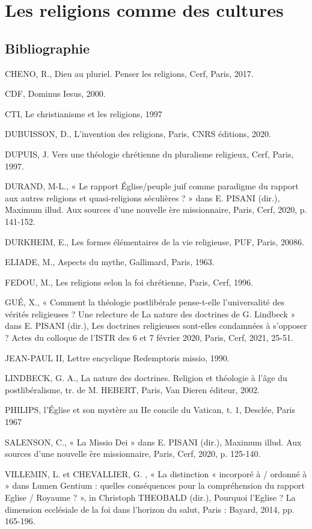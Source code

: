 \chapter{Les religions comme des cultures }


\section{Bibliographie}
CHENO, R., Dieu au pluriel. Penser les religions, Cerf, Paris, 2017. 

CDF, Dominus Iesus, 2000. 

CTI, Le christianisme et les religions, 1997 

DUBUISSON, D., L’invention des religions, Paris, CNRS éditions, 2020. 

DUPUIS, J. Vers une théologie chrétienne du pluralisme religieux, Cerf, Paris, 1997. 

DURAND, M-L., « Le rapport Église/peuple juif comme paradigme du rapport aux autres religions et quasi-religions séculières ? » dans E. PISANI (dir.), Maximum illud. Aux sources d’une nouvelle ère missionnaire, Paris, Cerf, 2020, p. 141-152. 

DURKHEIM, E., Les formes élémentaires de la vie religieuse, PUF, Paris, 20086. 

ELIADE, M., Aspects du mythe, Gallimard, Paris, 1963. 

FEDOU, M., Les religions selon la foi chrétienne, Paris, Cerf, 1996. 

GUÉ, X., « Comment la théologie postlibérale pense-t-elle l’universalité des vérités religieuses ? Une relecture de La nature des doctrines de G. Lindbeck » dans E. PISANI (dir.), Les doctrines religieuses sont-elles condamnées à s’opposer ? Actes du colloque de l’ISTR des 6 et 7 février 2020, Paris, Cerf, 2021, 25-51. 

JEAN-PAUL II, Lettre encyclique Redemptoris missio, 1990. 

LINDBECK, G. A., La nature des doctrines. Religion et théologie à l’âge du postlibéralisme, tr. de M. HEBERT, Paris, Van Dieren éditeur, 2002. 

PHILIPS, l’Église et son mystère au IIe concile du Vatican, t. 1, Desclée, Paris 1967 

SALENSON, C., « La Missio Dei » dans E. PISANI (dir.), Maximum illud. Aux sources d’une nouvelle ère missionnaire, Paris, Cerf, 2020, p. 125-140. 

VILLEMIN, L. et CHEVALLIER, G. , « La distinction « incorporé à / ordonné à » dans Lumen Gentium : quelles conséquences pour la compréhension du rapport Eglise / Royaume ? », in Christoph THEOBALD (dir.), Pourquoi l’Eglise ? La dimension ecclésiale de la foi dans l’horizon du salut, Paris : Bayard, 2014, pp. 165-196. 

